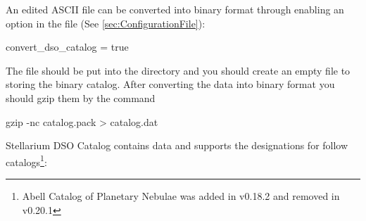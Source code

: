 An edited ASCII file can be converted into binary format through enabling an option in the file  (See \ref{sec:ConfigurationFile}):
\begin{configfile}
[devel]
convert_dso_catalog = true
\end{configfile}

The file  should be put into the directory
 and you should create an empty 
file  to storing the binary catalog. After converting the data into binary format 
you should gzip them by the command 
\begin{commands}
gzip -nc catalog.pack > catalog.dat
\end{commands}

Stellarium DSO Catalog contains data and supports the designations for
follow catalogs\footnote{Abell Catalog of Planetary Nebulae was added in v0.18.2 and removed in v0.20.1}:

